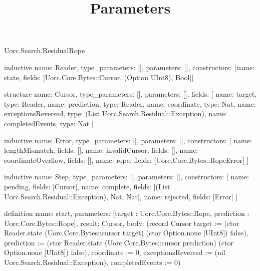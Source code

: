 \begin{lexlean}{Uorc.Search.ResidualRope}
\title{Parameters}
\begin{semanticmodule}
inductive{
  name: Reader,
  type_parameters: [],
  parameters: [],
  constructors: [{name: state, fields: [Uorc.Core.Bytes::Cursor, (Option UInt8), Bool]}]
}

structure{
  name: Cursor,
  type_parameters: [],
  parameters: [],
  fields: [
    {name: target, type: Reader},
    {name: prediction, type: Reader},
    {name: coordinate, type: Nat},
    {name: exceptionsReversed, type: (List Uorc.Search.Residual::Exception)},
    {name: completedEvents, type: Nat}
  ]
}

inductive{
  name: Error,
  type_parameters: [],
  parameters: [],
  constructors: [
    {name: lengthMismatch, fields: []},
    {name: invalidCursor, fields: []},
    {name: coordinateOverflow, fields: []},
    {name: rope, fields: [Uorc.Core.Bytes::RopeError]}
  ]
}

inductive{
  name: Step,
  type_parameters: [],
  parameters: [],
  constructors: [
    {name: pending, fields: [Cursor]},
    {name: complete, fields: [(List Uorc.Search.Residual::Exception), Nat, Nat]},
    {name: rejected, fields: [Error]}
  ]
}

definition{
  name: start,
  parameters: [target : Uorc.Core.Bytes::Rope, prediction : Uorc.Core.Bytes::Rope],
  result: Cursor,
  body: (record Cursor {target := (ctor Reader.state (Uorc.Core.Bytes::cursor target) (ctor Option.none [UInt8]) false), prediction := (ctor Reader.state (Uorc.Core.Bytes::cursor prediction) (ctor Option.none [UInt8]) false), coordinate := 0, exceptionsReversed := (nil Uorc.Search.Residual::Exception), completedEvents := 0})
}


\end{semanticmodule}
\end{lexlean}
